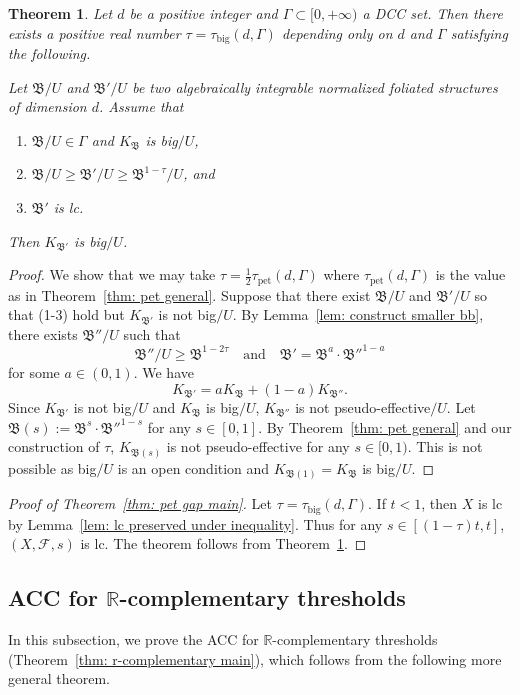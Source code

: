 \documentclass[11pt,reqno]{amsart}
\numberwithin{equation}{section}
\newcommand{\pet}{\operatorname{pet}}
\newcommand{\gt}{\operatorname{big}}
\newcommand{\Bb}{{\mathfrak{B}}}
\newcommand{\Ff}{\mathcal{F}}
\newcommand{\Ii}{\Gamma}
\newtheorem{thm}{Theorem}[section]
\theoremstyle{definition}
\begin{document}
\begin{thm}\label{thm: big gap general}
    Let $d$ be a positive integer and $\Ii\subset [0,+\infty)$ a DCC set. Then there exists a positive real number $\tau=\tau_{\gt}(d,\Ii)$ depending only on $d$ and $\Ii$ satisfying the following.

    Let $\Bb/U$ and $\Bb'/U$ be two algebraically integrable normalized foliated structures of dimension $d$. Assume that
    \begin{enumerate}
        \item $\Bb/U\in\Ii$ and $K_{\Bb}$ is big$/U$,
        \item $\Bb/U\geq\Bb'/U\geq\Bb^{1-\tau}/U$, and
        \item $\Bb'$ is lc.
    \end{enumerate}
    Then $K_{\Bb'}$ is big$/U$.
\end{thm}
\begin{proof}
We show that we may take $\tau=\frac{1}{2}\tau_{\pet}(d,\Ii)$ where $\tau_{\pet}(d,\Ii)$ is the value as in Theorem~\ref{thm: pet general}. Suppose that there exist $\Bb/U$ and $\Bb'/U$ so that (1-3) hold but $K_{\Bb'}$ is not big$/U$. By Lemma~\ref{lem: construct smaller bb}, there exists $\Bb''/U$ such that
$$\Bb''/U\geq\Bb^{1-2\tau}\quad \text{and}\quad  \Bb'=\Bb^{a}\cdot\Bb''^{1-a}$$
for some $a\in (0,1)$. We have
$$K_{\Bb'}=aK_{\Bb}+(1-a)K_{\Bb''}.$$
Since $K_{\Bb'}$ is not big$/U$ and $K_{\Bb}$ is big$/U$, $K_{\Bb''}$ is not pseudo-effective$/U$. Let $\Bb(s):=\Bb^s\cdot\Bb''^{1-s}$ for any $s\in [0,1]$. By Theorem~\ref{thm: pet general} and our construction of $\tau$, $K_{\Bb(s)}$ is not pseudo-effective for any $s\in [0,1)$. This is not possible as big$/U$ is an open condition and $K_{\Bb(1)}=K_{\Bb}$ is big$/U$.
\end{proof}

\begin{proof}[Proof of Theorem~\ref{thm: pet gap main}]
Let $\tau=\tau_{\gt}(d,\Ii)$. If $t<1$, then $X$ is lc by Lemma~\ref{lem: lc preserved under inequality}. Thus for any $s\in [(1-\tau)t,t]$, $(X,\Ff,s)$ is lc. The theorem follows from Theorem~\ref{thm: big gap general}.
\end{proof}

\subsection{ACC for \texorpdfstring{$\mathbb R$}{}-complementary thresholds}\label{subsec: acc rct}

In this subsection, we prove the ACC for $\mathbb R$-complementary thresholds (Theorem~\ref{thm: r-complementary main}), which follows from the following more general theorem.
\end{document}
